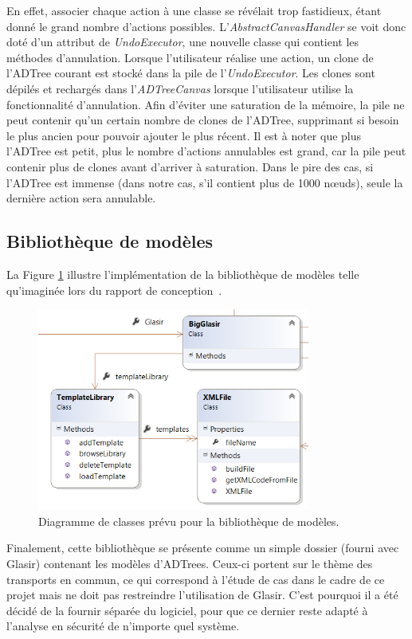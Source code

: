         En effet, associer chaque action à une classe se révélait trop fastidieux, étant donné le grand nombre d'actions possibles. L'\emph{AbstractCanvasHandler} se voit donc doté d'un attribut de \emph{UndoExecutor}, une nouvelle classe qui contient les méthodes d'annulation. Lorsque l'utilisateur réalise une action, un clone de l'ADTree courant est stocké dans la pile de l'\emph{UndoExecutor}. Les clones sont dépilés et rechargés dans l'\emph{ADTreeCanvas} lorsque l'utilisateur utilise la fonctionnalité d'annulation. Afin d'éviter une saturation de la mémoire, la pile ne peut contenir qu'un certain nombre de clones de l'ADTree, supprimant si besoin le plus ancien pour pouvoir ajouter le plus récent. Il est à noter que plus l'ADTree est petit, plus le nombre d'actions annulables est grand, car la pile peut contenir plus de clones avant d'arriver à saturation. Dans le pire des cas, si l'ADTree est immense 
				(dans notre cas, s'il contient plus de 1000 n\oe{}uds), seule la dernière action sera annulable. 

	\subsection{Bibliothèque de modèles}
    \label{ssec:bib}
		La {\sc Figure} \ref{fig:library} illustre l'implémentation de la bibliothèque de modèles telle qu'imaginée lors du rapport de conception~\cite{conception}. 
		
		\begin{figure}[H]
            \centering
                \includegraphics[width=0.8\textwidth]{figure/library.png}
            \caption{Diagramme de classes prévu pour la bibliothèque de modèles.}
            \label{fig:library}
        \end{figure}

        Finalement, cette bibliothèque se présente comme un simple dossier (fourni avec Glasir) contenant les modèles d'ADTrees. Ceux-ci portent sur le thème des transports en commun, ce qui correspond à l'étude de cas dans le cadre de ce projet mais ne doit pas restreindre l'utilisation de Glasir. C'est pourquoi il a été décidé de la fournir séparée du logiciel, pour que ce dernier reste adapté à l'analyse en sécurité de n'importe quel système.